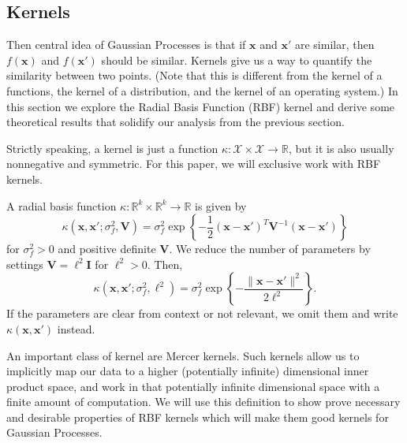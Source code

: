 \subsection{Kernels}

Then central idea of Gaussian Processes is that if $\mathbf{x}$ and $\mathbf{x}'$ are similar, then $f(\mathbf{x})$ and $f(\mathbf{x}')$ should be similar.
Kernels give us a way to quantify the similarity between two points.
(Note that this is different from the kernel of a functions, the kernel of a distribution, and the kernel of an operating system.)
In this section we explore the Radial Basis Function (RBF) kernel and derive some theoretical results that solidify our analysis from the previous section.

Strictly speaking, a kernel is just a function $\kappa: \mathcal{X} \times \mathcal{X} \to \mathbb{R}$, but it is also usually nonnegative and symmetric.
For this paper, we will exclusive work with RBF kernels.

\begin{definition}
    A radial basis function $\kappa: \mathbb{R}^{k} \times \mathbb{R}^{k} \to \mathbb{R}$
    is given by
    \begin{equation*}
        \kappa(\mathbf{x}, \mathbf{x}'; \sigma_f^2, \mathbf{V})
        = \sigma_f^{2} \exp \left\{ -\frac12 (\mathbf{x} - \mathbf{x}')^{T} \mathbf{V}^{-1} (\mathbf{x} - \mathbf{x}') \right\}
    \end{equation*}
    for $\sigma_f^2 > 0$ and positive definite $\mathbf{V}$.
    We reduce the number of parameters by settings $\mathbf{V} = \ell^2\mathbf{I}$ for $\ell^2 > 0$.
    Then,
    \begin{equation*}
        \kappa(\mathbf{x}, \mathbf{x}'; \sigma_f^2, \ell^2)
        = \sigma_f^{2} \exp \left\{ - \frac{ \lVert \mathbf{x} - \mathbf{x}' \rVert^2 }{ 2 \ell^2 }\right\}.
    \end{equation*}
    If the parameters are clear from context or not relevant, we omit them and write $\kappa(\mathbf{x}, \mathbf{x}')$ instead.
\end{definition}

An important class of kernel are Mercer kernels.
Such kernels allow us to implicitly map our data to a higher (potentially infinite) dimensional inner product space, and work in that potentially infinite dimensional space with a finite amount of computation.
We will use this definition to show prove necessary and desirable properties of RBF kernels which will make them good kernels for Gaussian Processes.

